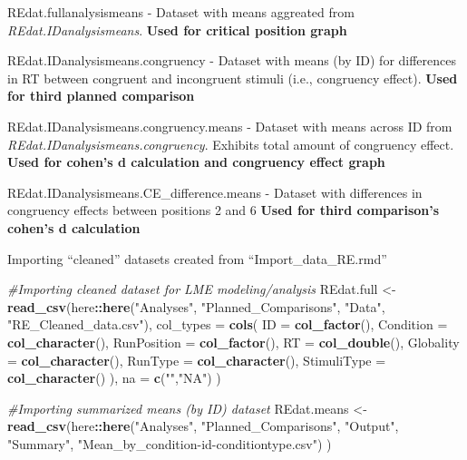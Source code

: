 \documentclass[
]{article}
\newenvironment{Shaded}{\begin{snugshade}}{\end{snugshade}}
\newcommand{\CommentTok}[1]{\textcolor[rgb]{0.56,0.35,0.01}{\textit{#1}}}
\newcommand{\DataTypeTok}[1]{\textcolor[rgb]{0.13,0.29,0.53}{#1}}
\newcommand{\KeywordTok}[1]{\textcolor[rgb]{0.13,0.29,0.53}{\textbf{#1}}}
\newcommand{\NormalTok}[1]{#1}
\newcommand{\OperatorTok}[1]{\textcolor[rgb]{0.81,0.36,0.00}{\textbf{#1}}}
\newcommand{\StringTok}[1]{\textcolor[rgb]{0.31,0.60,0.02}{#1}}
\begin{document}
REdat.fullanalysismeans - Dataset with means aggreated from
\emph{REdat.IDanalysismeans}. \textbf{Used for critical position graph}

REdat.IDanalysismeans.congruency - Dataset with means (by ID) for
differences in RT between congruent and incongruent stimuli (i.e.,
congruency effect). \textbf{Used for third planned comparison}

REdat.IDanalysismeans.congruency.means - Dataset with means across ID
from \emph{REdat.IDanalysismeans.congruency}. Exhibits total amount of
congruency effect. \textbf{Used for cohen's d calculation and congruency
effect graph}

REdat.IDanalysismeans.CE\_difference.means - Dataset with differences in
congruency effects between positions 2 and 6 \textbf{Used for third
comparison's cohen's d calculation}

Importing ``cleaned'' datasets created from ``Import\_data\_RE.rmd''

\begin{Shaded}
\begin{Highlighting}[]
\CommentTok{#Importing cleaned dataset for LME modeling/analysis}
\NormalTok{REdat.full <-}\KeywordTok{read_csv}\NormalTok{(here}\OperatorTok{::}\KeywordTok{here}\NormalTok{(}\StringTok{"Analyses"}\NormalTok{, }\StringTok{"Planned_Comparisons"}\NormalTok{, }\StringTok{"Data"}\NormalTok{, }\StringTok{"RE_Cleaned_data.csv"}\NormalTok{),}
                    \DataTypeTok{col_types =} \KeywordTok{cols}\NormalTok{(}
                      \DataTypeTok{ID =} \KeywordTok{col_factor}\NormalTok{(),}
                      \DataTypeTok{Condition =} \KeywordTok{col_character}\NormalTok{(),}
                      \DataTypeTok{RunPosition =} \KeywordTok{col_factor}\NormalTok{(),}
                      \DataTypeTok{RT =} \KeywordTok{col_double}\NormalTok{(),}
                      \DataTypeTok{Globality =} \KeywordTok{col_character}\NormalTok{(),}
                      \DataTypeTok{RunType =} \KeywordTok{col_character}\NormalTok{(),}
                      \DataTypeTok{StimuliType =} \KeywordTok{col_character}\NormalTok{()}
\NormalTok{                      ),}
                    \DataTypeTok{na =} \KeywordTok{c}\NormalTok{(}\StringTok{""}\NormalTok{,}\StringTok{"NA"}\NormalTok{)}
\NormalTok{                    ) }

\CommentTok{#Importing summarized means (by ID) dataset                    }
\NormalTok{REdat.means <-}\StringTok{ }\KeywordTok{read_csv}\NormalTok{(here}\OperatorTok{::}\KeywordTok{here}\NormalTok{(}\StringTok{"Analyses"}\NormalTok{, }\StringTok{"Planned_Comparisons"}\NormalTok{, }\StringTok{"Output"}\NormalTok{, }\StringTok{"Summary"}\NormalTok{, }\StringTok{"Mean_by_condition-id-conditiontype.csv"}\NormalTok{)}
\NormalTok{                )}
\end{Highlighting}
\end{Shaded}
\end{document}
